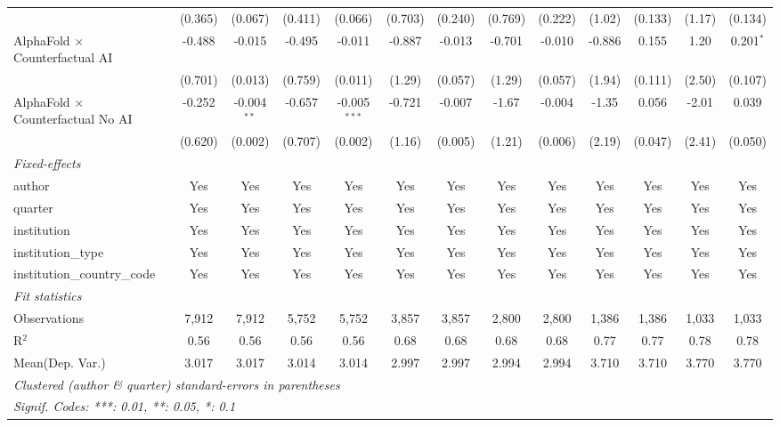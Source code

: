 \begin{tabular}{lcccccccccccc}
                                            & (0.365) & (0.067)       & (0.411) & (0.066)        & (0.703) & (0.240) & (0.769)     & (0.222) & (1.02)  & (0.133)      & (1.17) & (0.134)\\   
   AlphaFold $\times$ Counterfactual AI     & -0.488  & -0.015        & -0.495  & -0.011         & -0.887  & -0.013  & -0.701      & -0.010  & -0.886  & 0.155        & 1.20   & 0.201$^{*}$\\   
                                            & (0.701) & (0.013)       & (0.759) & (0.011)        & (1.29)  & (0.057) & (1.29)      & (0.057) & (1.94)  & (0.111)      & (2.50) & (0.107)\\   
   AlphaFold $\times$ Counterfactual No AI  & -0.252  & -0.004$^{**}$ & -0.657  & -0.005$^{***}$ & -0.721  & -0.007  & -1.67       & -0.004  & -1.35   & 0.056        & -2.01  & 0.039\\   
                                            & (0.620) & (0.002)       & (0.707) & (0.002)        & (1.16)  & (0.005) & (1.21)      & (0.006) & (2.19)  & (0.047)      & (2.41) & (0.050)\\   
   \midrule
   \emph{Fixed-effects}\\
   author                                   & Yes     & Yes           & Yes     & Yes            & Yes     & Yes     & Yes         & Yes     & Yes     & Yes          & Yes    & Yes\\  
   quarter                                  & Yes     & Yes           & Yes     & Yes            & Yes     & Yes     & Yes         & Yes     & Yes     & Yes          & Yes    & Yes\\  
   institution                              & Yes     & Yes           & Yes     & Yes            & Yes     & Yes     & Yes         & Yes     & Yes     & Yes          & Yes    & Yes\\  
   institution\_type                        & Yes     & Yes           & Yes     & Yes            & Yes     & Yes     & Yes         & Yes     & Yes     & Yes          & Yes    & Yes\\  
   institution\_country\_code               & Yes     & Yes           & Yes     & Yes            & Yes     & Yes     & Yes         & Yes     & Yes     & Yes          & Yes    & Yes\\  
   \midrule
   \emph{Fit statistics}\\
   Observations                             & 7,912   & 7,912         & 5,752   & 5,752          & 3,857   & 3,857   & 2,800       & 2,800   & 1,386   & 1,386        & 1,033  & 1,033\\  
   R$^2$                                    & 0.56    & 0.56          & 0.56    & 0.56           & 0.68    & 0.68    & 0.68        & 0.68    & 0.77    & 0.77         & 0.78   & 0.78\\  
Mean(Dep. Var.) & 3.017 & 3.017 & 3.014 & 3.014 & 2.997 & 2.997 & 2.994 & 2.994 & 3.710 & 3.710 & 3.770 & 3.770 \\
   \midrule \midrule
   \multicolumn{13}{l}{\emph{Clustered (author \& quarter) standard-errors in parentheses}}\\
   \multicolumn{13}{l}{\emph{Signif. Codes: ***: 0.01, **: 0.05, *: 0.1}}\\
\end{tabular}
\par\endgroup
